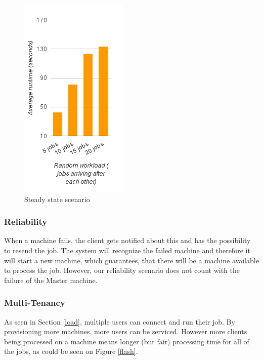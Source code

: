 \begin{figure}
 \centering

 \includegraphics{random-graph}
 \caption{Steady state scenario}
  \label{steady}
\end{figure}

\subsubsection{Reliability}
When a machine fails, the client gets notified about this and has the possibility to resend the job. The system will recognize the failed machine and therefore it will start a new machine, which guarantees, that there will be a machine available to process the job. However, our reliability scenario does not count with the failure of the Master machine.

\subsubsection{Multi-Tenancy}
As seen in Section \ref{load}, multiple users can connect and run their job. By provisioning more machines, more users can be serviced. However more clients being processed on a machine means longer (but fair) processing time for all of the jobs, as could be seen on Figure \ref{flash}.